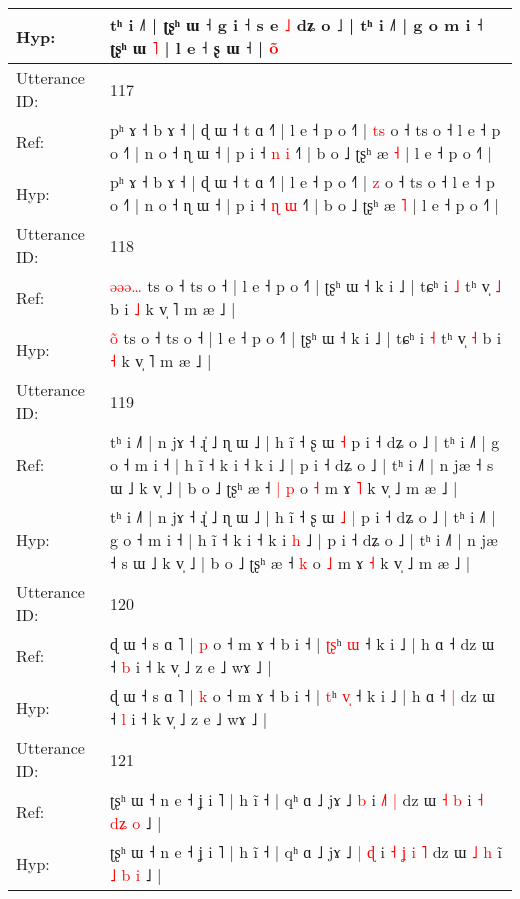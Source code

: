 \documentclass[10pt]{article}
\DeclareRobustCommand{\hl}[1]{{\textcolor{red}{#1}}}
\begin{document}
\begin{longtable}{ll}
 \\
Hyp: & tʰ i ˩˥ | ʈʂʰ ɯ ˧ g i ˧ s e \hl{˩} dʑ o ˩ | tʰ i ˩˥ | g o\hl{}\hl{} m i ˧ ʈʂʰ ɯ \hl{˥} | l e ˧ ʂ ɯ ˧ | \hl{o}̃
 \\
\midrule
Utterance ID: & 117 \\
Ref: & pʰ ɤ ˧ b ɤ ˧ | ɖ ɯ ˧ t ɑ ˧˥ | l e ˧ p o ˧˥ | \hl{t}\hl{s} o ˧ ts o ˧ l e ˧ p o ˧˥ | n o ˧ ɳ ɯ ˧ | p i ˧ \hl{n} \hl{i} ˧˥ | b o ˩ ʈʂʰ æ \hl{˧} | l e ˧ p o ˧˥ |
 \\
Hyp: & pʰ ɤ ˧ b ɤ ˧ | ɖ ɯ ˧ t ɑ ˧˥ | l e ˧ p o ˧˥ | \hl{}\hl{z} o ˧ ts o ˧ l e ˧ p o ˧˥ | n o ˧ ɳ ɯ ˧ | p i ˧ \hl{ɳ} \hl{ɯ} ˧˥ | b o ˩ ʈʂʰ æ \hl{˥} | l e ˧ p o ˧˥ |
 \\
\midrule
Utterance ID: & 118 \\
Ref: & \hl{ə}\hl{ə}\hl{ə}\hl{…} ts o ˧ ts o ˧ | l e ˧ p o ˧˥ | ʈʂʰ ɯ ˧ k i ˩ | tɕʰ i \hl{˩} tʰ v̩ \hl{˩} b i \hl{˩} k v̩ ˥ m æ ˩ |
 \\
Hyp: & \hl{}\hl{}\hl{o}\hl{̃} ts o ˧ ts o ˧ | l e ˧ p o ˧˥ | ʈʂʰ ɯ ˧ k i ˩ | tɕʰ i \hl{˧} tʰ v̩ \hl{˧} b i \hl{˧} k v̩ ˥ m æ ˩ |
 \\
\midrule
Utterance ID: & 119 \\
Ref: & tʰ i ˩˥ | n jɤ ˧ ɻ̍ ˩ ɳ ɯ ˩ | h ĩ ˧ ʂ ɯ\hl{}\hl{} \hl{˧} p i ˧ dʑ o ˩ | tʰ i ˩˥ | g o ˧ m i ˧ | h ĩ ˧ k i ˧ k i\hl{}\hl{} ˩ | p i ˧ dʑ o ˩ | tʰ i ˩˥ | n jæ ˧ s ɯ ˩ k v̩ ˩ | b o ˩ ʈʂʰ æ ˧\hl{ }\hl{|} \hl{p} o \hl{˧} m ɤ \hl{˥} k v̩ ˩ m æ ˩ |
 \\
Hyp: & tʰ i ˩˥ | n jɤ ˧ ɻ̍ ˩ ɳ ɯ ˩ | h ĩ ˧ ʂ ɯ\hl{ }\hl{˩} \hl{|} p i ˧ dʑ o ˩ | tʰ i ˩˥ | g o ˧ m i ˧ | h ĩ ˧ k i ˧ k i\hl{ }\hl{h} ˩ | p i ˧ dʑ o ˩ | tʰ i ˩˥ | n jæ ˧ s ɯ ˩ k v̩ ˩ | b o ˩ ʈʂʰ æ ˧\hl{}\hl{} \hl{k} o \hl{˩} m ɤ \hl{˧} k v̩ ˩ m æ ˩ |
 \\
\midrule
Utterance ID: & 120 \\
Ref: & ɖ ɯ ˧ s ɑ ˥ | \hl{p} o ˧ m ɤ ˧ b i ˧ | \hl{ʈ}\hl{ʂ}ʰ \hl{}\hl{ɯ} ˧ k i ˩ | h ɑ ˧\hl{}\hl{} dz ɯ ˧ \hl{b} i ˧ k v̩ ˩ z e ˩ wɤ ˩ |
 \\
Hyp: & ɖ ɯ ˧ s ɑ ˥ | \hl{k} o ˧ m ɤ ˧ b i ˧ | \hl{}\hl{t}ʰ \hl{v}\hl{̩} ˧ k i ˩ | h ɑ ˧\hl{ }\hl{|} dz ɯ ˧ \hl{l} i ˧ k v̩ ˩ z e ˩ wɤ ˩ |
 \\
\midrule
Utterance ID: & 121 \\
Ref: & ʈʂʰ ɯ ˧ n e ˧ ʝ i ˥ | h ĩ ˧ | qʰ ɑ ˩ jɤ ˩\hl{}\hl{} \hl{b} i\hl{}\hl{} \hl{}\hl{˩}\hl{˥} \hl{|} dz ɯ \hl{˧} \hl{b} i\hl{} \hl{˧} \hl{d}\hl{ʑ} \hl{o} ˩ |
 \\
Hyp: & ʈʂʰ ɯ ˧ n e ˧ ʝ i ˥ | h ĩ ˧ | qʰ ɑ ˩ jɤ ˩\hl{ }\hl{|} \hl{ɖ} i\hl{ }\hl{˧} \hl{ʝ}\hl{ }\hl{i} \hl{˥} dz ɯ \hl{˩} \hl{h} i\hl{̃} \hl{˩} \hl{}\hl{b} \hl{i} ˩ |

\end{longtable}
\end{document}
